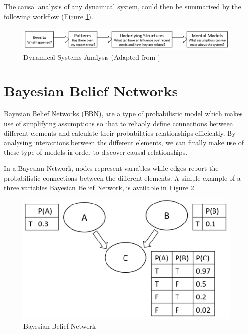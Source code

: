 The causal analysis of any dynamical system, could then be summarised by the following workflow (Figure \ref{wow2}). 

\begin{figure}[ht!]%
    \centering
    \includegraphics[width=1\linewidth]{latex/images/discover.pdf}
    \vspace{-0.6cm}
    \caption{Dynamical Systems Analysis (Adapted from \cite{system})}
    \label{wow2}
\end{figure}
\vspace{-0.5cm}

\section{Bayesian Belief Networks}
\label{bbn_ref}
Bayesian Belief Networks (BBN), are a type of probabilistic model which makes use of simplifying assumptions so that to reliably define connections between different elements and calculate their probabilities relationships efficiently. By analysing interactions between the different elements, we can finally make use of these type of models in order to discover causal relationships. 

In a Bayesian Network, nodes represent variables while edges report the probabilistic connections between the different elements. A simple example of a three variables Bayesian Belief Network, is available in Figure \ref{net}. 

\vspace{-0.5cm}
\begin{figure}[ht!]%
    \centering
    \includegraphics[width=0.7\linewidth]{latex/images/bayes.pdf}
    \vspace{-0.2cm}
    \caption{Bayesian Belief Network}
    \label{net}
\end{figure}
\vspace{-0.7cm}

